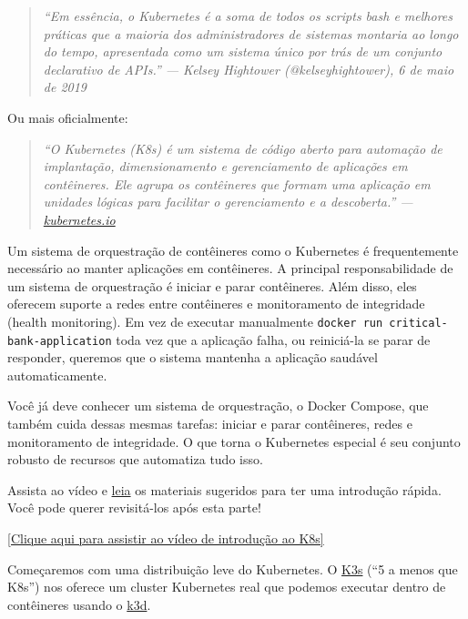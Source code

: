 \documentclass[12pt,a4paper]{article}
\begin{document}
\begin{quote}
\textit{``Em essência, o Kubernetes é a soma de todos os scripts bash e melhores práticas que a maioria dos administradores de sistemas montaria ao longo do tempo, apresentada como um sistema único por trás de um conjunto declarativo de APIs.'' — Kelsey Hightower (@kelseyhightower), 6 de maio de 2019}
\end{quote}

Ou mais oficialmente:

\begin{quote}
\textit{``O Kubernetes (K8s) é um sistema de código aberto para automação de implantação, dimensionamento e gerenciamento de aplicações em contêineres. Ele agrupa os contêineres que formam uma aplicação em unidades lógicas para facilitar o gerenciamento e a descoberta.'' — \href{https://kubernetes.io/}{kubernetes.io}}
\end{quote}

Um sistema de orquestração de contêineres como o Kubernetes é frequentemente necessário ao manter aplicações em contêineres. A principal responsabilidade de um sistema de orquestração é iniciar e parar contêineres. Além disso, eles oferecem suporte a redes entre contêineres e monitoramento de integridade (health monitoring). Em vez de executar manualmente \texttt{docker run critical-bank-application} toda vez que a aplicação falha, ou reiniciá-la se parar de responder, queremos que o sistema mantenha a aplicação saudável automaticamente.

Você já deve conhecer um sistema de orquestração, o Docker Compose, que também cuida dessas mesmas tarefas: iniciar e parar contêineres, redes e monitoramento de integridade. O que torna o Kubernetes especial é seu conjunto robusto de recursos que automatiza tudo isso.

Assista ao vídeo e \href{https://cloud.google.com/kubernetes-engine/kubernetes-comic/}{leia} os materiais sugeridos para ter uma introdução rápida. Você pode querer revisitá-los após esta parte!

\vspace{1em}

\begin{center}
  \href{https://www.youtube.com/watch?v=Q4W8Z-D-gcQ}{[Clique aqui para assistir ao vídeo de introdução ao K8s]}
\end{center}

\vspace{1em}

Começaremos com uma distribuição leve do Kubernetes. O \href{https://k3s.io/}{K3s} (``5 a menos que K8s'') nos oferece um cluster Kubernetes real que podemos executar dentro de contêineres usando o \href{https://github.com/k3d-io/k3d}{k3d}.
\end{document}
